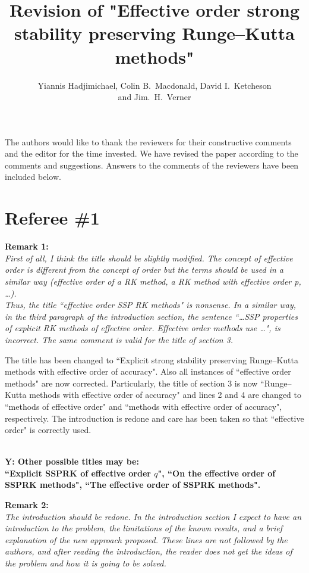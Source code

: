 \documentclass[12pt]{article}
\newcommand{\remark}[2]{\vspace{25pt} \noindent \textbf{Remark #1:\newline} \textit{#2}\vspace{15pt}}
\renewcommand{\newline}{\vspace{15pt}\\}
\newcommand{\yiannis}[1]{\textcolor{OliveGreen}{\\\textbf{Y: \footnotesize #1}\\}}
\begin{document}
\title{Revision of "Effective order strong stability preserving Runge--Kutta methods"}
\author{Yiannis Hadjimichael, Colin B.~Macdonald, David I.~Ketcheson \\ and  Jim.~H.~Verner}

\maketitle

The authors would like to thank the reviewers for their constructive comments and the
editor for the time invested. 
We have revised the paper according to the comments and suggestions. 
Answers to the comments of the reviewers have been included below.
\vspace{30pt}

\section*{Referee \#1}
\remark{1}
{First of all, I think the title should be slightly modified. 
The concept of \textit{effective order} is different from the concept of \textit{order} 
but the terms should be used in a similar way (\textit{effective order of a RK method, 
a RK method with effective order p, \dots}).
\newline
Thus, the title ``effective order SSP RK methods" is nonsense.
In a similar way, in the third paragraph of the introduction section, the sentence 
``\dots SSP properties of explicit RK methods of effective order. Effective order 
methods use \dots", is incorrect.
The same comment is valid for the title of section 3.}

The title has been changed to ``Explicit strong stability preserving Runge--Kutta methods
with effective order of accuracy". 
Also all instances of ``effective order methods" are now corrected.
Particularly, the title of section 3 is now ``Runge--Kutta methods with effective order 
of accuracy" and lines 2 and 4 are changed to ``methods of effective order" and
``methods with effective order of accuracy", respectively.
The introduction is redone and care has been taken so that ``effective order" 
is correctly used.

\yiannis{Other possible titles may be:\\
``Explicit SSPRK of effective order $q$", ``On the effective order of SSPRK methods",
``The effective order of SSPRK methods".}

\remark{2}{
The introduction should be redone. 
In the introduction section I expect to have an introduction to the problem, the 
limitations of the known results, and a brief explanation of the new approach proposed. 
These lines are not followed by the authors, and after reading the introduction, the 
reader does not get the ideas of the problem and how it is going to be solved.}
\end{document}

